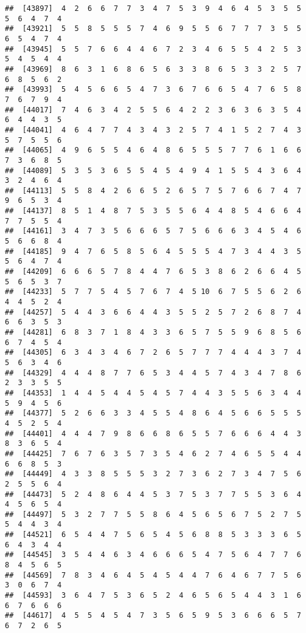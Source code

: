 \documentclass[
]{book}
\begin{document}
\begin{verbatim}
##  [43897]  4  2  6  6  7  7  3  4  7  5  3  9  4  6  4  5  3  5  5  5  6  4  7  4
##  [43921]  5  5  8  5  5  5  7  4  6  9  5  5  6  7  7  7  3  5  5  6  5  4  7  4
##  [43945]  5  5  7  6  6  4  4  6  7  2  3  4  6  5  5  4  2  5  3  5  4  5  4  4
##  [43969]  8  6  3  1  6  8  6  5  6  3  3  8  6  5  3  3  2  5  7  6  8  5  6  2
##  [43993]  5  4  5  6  6  5  4  7  3  6  7  6  6  5  4  7  6  5  8  7  6  7  9  4
##  [44017]  7  4  6  3  4  2  5  5  6  4  2  2  3  6  3  6  3  5  4  6  4  4  3  5
##  [44041]  4  6  4  7  7  4  3  4  3  2  5  7  4  1  5  2  7  4  3  5  7  5  5  6
##  [44065]  4  9  6  5  5  4  6  4  8  6  5  5  5  7  7  6  1  6  6  7  3  6  8  5
##  [44089]  5  3  5  3  6  5  5  4  5  4  9  4  1  5  5  4  3  6  4  3  2  4  6  4
##  [44113]  5  5  8  4  2  6  6  5  2  6  5  7  5  7  6  6  7  4  7  9  6  5  3  4
##  [44137]  8  5  1  4  8  7  5  3  5  5  6  4  4  8  5  4  6  6  4  7  7  5  5  4
##  [44161]  3  4  7  3  5  6  6  6  5  7  5  6  6  6  3  4  5  4  6  5  6  6  8  4
##  [44185]  9  4  7  6  5  8  5  6  4  5  5  5  4  7  3  4  4  3  5  5  6  4  7  4
##  [44209]  6  6  6  5  7  8  4  4  7  6  5  3  8  6  2  6  6  4  5  5  6  5  3  7
##  [44233]  5  7  7  5  4  5  7  6  7  4  5 10  6  7  5  5  6  2  6  4  4  5  2  4
##  [44257]  5  4  4  3  6  6  4  4  3  5  5  2  5  7  2  6  8  7  4  6  6  3  5  3
##  [44281]  6  8  3  7  1  8  4  3  3  6  5  7  5  5  9  6  8  5  6  6  7  4  5  4
##  [44305]  6  3  4  3  4  6  7  2  6  5  7  7  7  4  4  4  3  7  4  5  6  3  4  6
##  [44329]  4  4  4  8  7  7  6  5  3  4  4  5  7  4  3  4  7  8  6  2  3  3  5  5
##  [44353]  1  4  4  5  4  4  5  4  5  7  4  4  3  5  5  6  3  4  4  5  9  4  5  6
##  [44377]  5  2  6  6  3  3  4  5  5  4  8  6  4  5  6  6  5  5  5  4  5  2  5  4
##  [44401]  4  4  4  7  9  8  6  6  8  6  5  5  7  6  6  6  4  4  3  8  3  6  5  4
##  [44425]  7  6  7  6  3  5  7  3  5  4  6  2  7  4  6  5  5  4  4  6  6  8  5  3
##  [44449]  4  3  3  8  5  5  5  3  2  7  3  6  2  7  3  4  7  5  6  2  5  5  6  4
##  [44473]  5  2  4  8  6  4  4  5  3  7  5  3  7  7  5  5  3  6  4  4  5  6  5  4
##  [44497]  5  3  2  7  7  5  5  8  6  4  5  6  5  6  7  5  2  7  5  5  4  4  3  4
##  [44521]  6  5  4  4  7  5  6  5  4  5  6  8  8  5  3  3  3  6  5  6  4  3  4  4
##  [44545]  3  5  4  4  6  3  4  6  6  6  5  4  7  5  6  4  7  7  6  8  4  5  6  5
##  [44569]  7  8  3  4  6  4  5  4  5  4  4  7  6  4  6  7  7  5  6  3  0  6  7  4
##  [44593]  3  6  4  7  5  3  6  5  2  4  6  5  6  5  4  4  3  1  6  6  7  6  6  6
##  [44617]  4  5  5  4  5  4  7  3  5  6  5  9  5  3  6  6  6  5  7  6  7  2  6  5

\end{verbatim}
\end{document}
